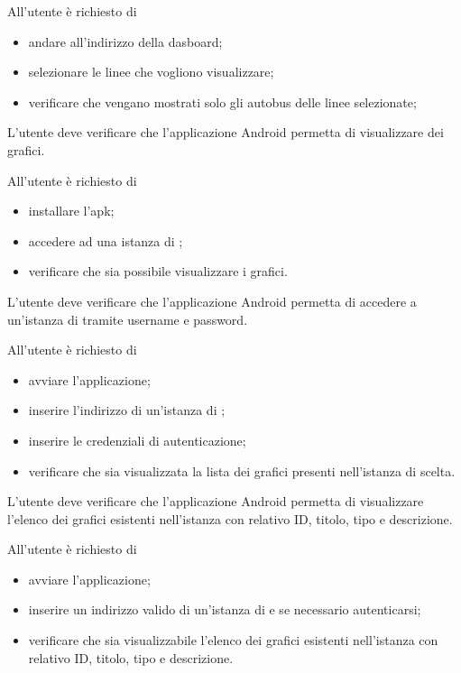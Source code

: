 		All'utente è richiesto di
		\begin{itemize}
			\item andare all'indirizzo della dasboard;
			\item selezionare le linee che vogliono visualizzare;
			\item verificare che vengano mostrati solo gli autobus delle linee selezionate;
		\end{itemize}

	L'utente deve verificare che l'applicazione Android permetta di visualizzare dei grafici.

		All'utente è richiesto di
		\begin{itemize}
			\item installare l'apk;
			\item accedere ad una istanza di \projectname{};
			\item verificare che sia possibile visualizzare i grafici.
		\end{itemize}

	L'utente deve verificare che l'applicazione Android permetta di accedere a un'istanza di \projectname{} tramite username e password.

		All'utente è richiesto di
		\begin{itemize}
			\item avviare l'applicazione;
			\item inserire l'indirizzo di un'istanza di \projectname{};
			\item inserire le credenziali di autenticazione;
			\item verificare che sia visualizzata la lista dei grafici presenti nell'istanza di \projectname{} scelta.
		\end{itemize}

	L'utente deve verificare che l'applicazione Android permetta di visualizzare l'elenco dei grafici esistenti nell'istanza \projectname{} con relativo ID, titolo, tipo e descrizione.

		All'utente è richiesto di
		\begin{itemize}
			\item avviare l'applicazione;
			\item inserire un indirizzo valido di un'istanza di \projectname{} e se necessario autenticarsi;
			\item verificare che sia visualizzabile l'elenco dei grafici esistenti nell'istanza \projectname{} con relativo ID, titolo, tipo e descrizione.
		\end{itemize}


